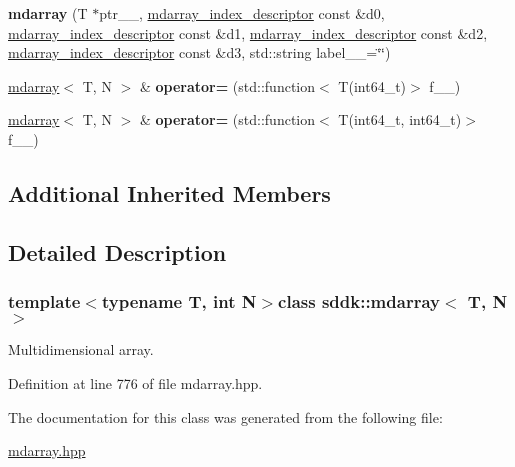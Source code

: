\begin{DoxyCompactItemize}
\item 
\hypertarget{classsddk_1_1mdarray_a3896b3630dc0c6e8cc31bd8ca78c0d78}{}{\bfseries mdarray} (T $\ast$ptr\+\_\+\+\_\+, \hyperlink{classsddk_1_1mdarray__index__descriptor}{mdarray\+\_\+index\+\_\+descriptor} const \&d0, \hyperlink{classsddk_1_1mdarray__index__descriptor}{mdarray\+\_\+index\+\_\+descriptor} const \&d1, \hyperlink{classsddk_1_1mdarray__index__descriptor}{mdarray\+\_\+index\+\_\+descriptor} const \&d2, \hyperlink{classsddk_1_1mdarray__index__descriptor}{mdarray\+\_\+index\+\_\+descriptor} const \&d3, std\+::string label\+\_\+\+\_\+=\char`\"{}\char`\"{})\label{classsddk_1_1mdarray_a3896b3630dc0c6e8cc31bd8ca78c0d78}

\item 
\hypertarget{classsddk_1_1mdarray_aef57d8465acb349e9767d1cfc879cc22}{}\hyperlink{classsddk_1_1mdarray}{mdarray}$<$ T, N $>$ \& {\bfseries operator=} (std\+::function$<$ T(int64\+\_\+t)$>$ f\+\_\+\+\_\+)\label{classsddk_1_1mdarray_aef57d8465acb349e9767d1cfc879cc22}

\item 
\hypertarget{classsddk_1_1mdarray_ab4d2e7c57fc1f728a262f15a27eb4889}{}\hyperlink{classsddk_1_1mdarray}{mdarray}$<$ T, N $>$ \& {\bfseries operator=} (std\+::function$<$ T(int64\+\_\+t, int64\+\_\+t)$>$ f\+\_\+\+\_\+)\label{classsddk_1_1mdarray_ab4d2e7c57fc1f728a262f15a27eb4889}

\end{DoxyCompactItemize}
\subsection*{Additional Inherited Members}


\subsection{Detailed Description}
\subsubsection*{template$<$typename T, int N$>$class sddk\+::mdarray$<$ T, N $>$}

Multidimensional array. 

Definition at line 776 of file mdarray.\+hpp.



The documentation for this class was generated from the following file\+:\begin{DoxyCompactItemize}
\item 
\hyperlink{mdarray_8hpp}{mdarray.\+hpp}\end{DoxyCompactItemize}
